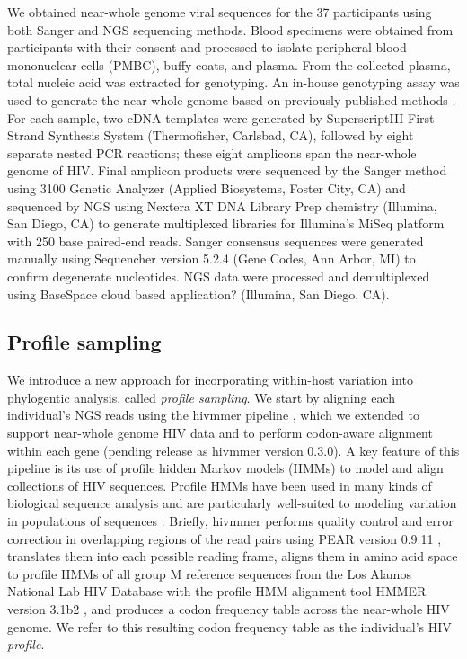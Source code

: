 \documentclass[letterpaper]{article}
\begin{document}
We obtained near-whole genome viral sequences for the 37 participants using both Sanger and NGS sequencing methods. Blood specimens were obtained from participants with their consent and processed to isolate peripheral blood mononuclear cells (PMBC), buffy coats, and plasma. From the collected plasma, total nucleic acid was extracted for genotyping. An in-house genotyping assay was used to generate the near-whole genome based on previously published methods \parencite{nadai, di_giallonardo}. For each sample, two cDNA templates were generated by SuperscriptIII First Strand Synthesis System (Thermofisher, Carlsbad, CA), followed by eight separate nested PCR reactions; these eight amplicons span the near-whole genome of HIV.  Final amplicon products were sequenced by the Sanger method using 3100 Genetic Analyzer (Applied Biosystems, Foster City, CA) and sequenced by NGS using Nextera XT DNA Library Prep chemistry (Illumina, San Diego, CA) to generate multiplexed libraries for Illumina's MiSeq platform with 250 base paired-end reads. Sanger consensus sequences were generated manually using Sequencher version 5.2.4 (Gene Codes, Ann Arbor, MI) to confirm degenerate nucleotides. NGS data were processed and demultiplexed using BaseSpace cloud based application? (Illumina, San Diego, CA).

\subsection*{Profile sampling}

We introduce a new approach for incorporating within-host variation into phylogentic analysis, called \emph{profile sampling}. We start by aligning each individual's NGS reads using the hivmmer pipeline \parencite{howison}, which we extended to support near-whole genome HIV data and to perform codon-aware alignment within each gene (pending release as hivmmer version 0.3.0). A key feature of this pipeline is its use of profile hidden Markov models (HMMs) to model and align collections of HIV sequences. Profile HMMs have been used in many kinds of biological sequence analysis and are particularly well-suited to modeling variation in populations of sequences \parencite{eddy2004}. Briefly, hivmmer performs quality control and error correction in overlapping regions of the read pairs using PEAR version 0.9.11 \parencite{zhang}, translates them into each possible reading frame, aligns them in amino acid space to profile HMMs of all group M reference sequences from the Los Alamos National Lab HIV Database with the profile HMM alignment tool HMMER version 3.1b2 \parencite{eddy2013}, and produces a codon frequency table across the near-whole HIV genome. We refer to this resulting codon frequency table as the individual's HIV \emph{profile}.
\end{document}
